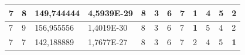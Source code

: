 \documentclass[conference]{IEEEtran}
\begin{document}
\begin{table}[]
\begin{tabular}{|llll|llllllll|}
\multicolumn{1}{|l|}{7}                                                     & \multicolumn{1}{l|}{8}                                                        & \multicolumn{1}{l|}{149,744444}                                                   & 4,5939E-29                     & \multicolumn{1}{l|}{8}                                                  & \multicolumn{1}{l|}{3}                                                  & \multicolumn{1}{l|}{6}                                                  & \multicolumn{1}{l|}{7}                                                  & \multicolumn{1}{l|}{\textbf{1}}                                         & \multicolumn{1}{l|}{4}                                                  & \multicolumn{1}{l|}{5}                                                  & 2                          \\ \hline
\multicolumn{1}{|l|}{7}                                                     & \multicolumn{1}{l|}{9}                                                        & \multicolumn{1}{l|}{156,955556}                                                   & 1,4019E-30                     & \multicolumn{1}{l|}{8}                                                  & \multicolumn{1}{l|}{3}                                                  & \multicolumn{1}{l|}{6}                                                  & \multicolumn{1}{l|}{7}                                                  & \multicolumn{1}{l|}{\textbf{1}}                                         & \multicolumn{1}{l|}{5}                                                  & \multicolumn{1}{l|}{4}                                                  & 2                          \\ \hline
\multicolumn{1}{|l|}{7}                                                     & \multicolumn{1}{l|}{7}                                                        & \multicolumn{1}{l|}{142,188889}                                                   & 1,7677E-27                     & \multicolumn{1}{l|}{8}                                                  & \multicolumn{1}{l|}{3}                                                  & \multicolumn{1}{l|}{6}                                                  & \multicolumn{1}{l|}{7}                                                  & \multicolumn{1}{l|}{2}                                                  & \multicolumn{1}{l|}{4}                                                  & \multicolumn{1}{l|}{5}                                                  & \textbf{1}                 \\ \hline

\end{tabular}
\end{table}
\end{document}
